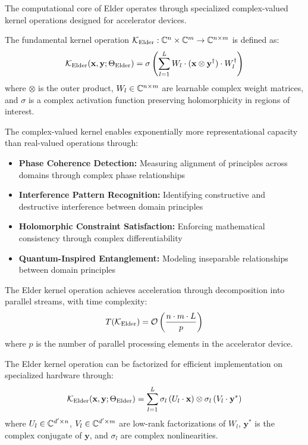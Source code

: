 The computational core of Elder operates through specialized complex-valued kernel operations designed for accelerator devices.

\begin{definition}
The fundamental kernel operation $\mathcal{K}_{\text{Elder}}: \mathbb{C}^n \times \mathbb{C}^m \rightarrow \mathbb{C}^{n \times m}$ is defined as:
\begin{equation}
\mathcal{K}_{\text{Elder}}(\mathbf{x}, \mathbf{y}; \Theta_{\text{Elder}}) = \sigma\left(\sum_{l=1}^L W_l \cdot (\mathbf{x} \otimes \mathbf{y}^{\dagger}) \cdot W_l^{\dagger}\right)
\end{equation}
where $\otimes$ is the outer product, $W_l \in \mathbb{C}^{n \times m}$ are learnable complex weight matrices, and $\sigma$ is a complex activation function preserving holomorphicity in regions of interest.
\end{definition}

The complex-valued kernel enables exponentially more representational capacity than real-valued operations through:

\begin{itemize}
    \item \textbf{Phase Coherence Detection:} Measuring alignment of principles across domains through complex phase relationships
    \item \textbf{Interference Pattern Recognition:} Identifying constructive and destructive interference between domain principles
    \item \textbf{Holomorphic Constraint Satisfaction:} Enforcing mathematical consistency through complex differentiability
    \item \textbf{Quantum-Inspired Entanglement:} Modeling inseparable relationships between domain principles
\end{itemize}

\begin{theorem}
The Elder kernel operation achieves acceleration through decomposition into parallel streams, with time complexity:
\begin{equation}
T(\mathcal{K}_{\text{Elder}}) = \mathcal{O}\left(\frac{n \cdot m \cdot L}{p}\right)
\end{equation}
where $p$ is the number of parallel processing elements in the accelerator device.
\end{theorem}

\begin{proposition}
The Elder kernel operation can be factorized for efficient implementation on specialized hardware through:
\begin{equation}
\mathcal{K}_{\text{Elder}}(\mathbf{x}, \mathbf{y}; \Theta_{\text{Elder}}) = \sum_{l=1}^L \sigma_l\left(U_l \cdot \mathbf{x}\right) \otimes \sigma_l\left(V_l \cdot \mathbf{y}^*\right)
\end{equation}
where $U_l \in \mathbb{C}^{d' \times n}$, $V_l \in \mathbb{C}^{d' \times m}$ are low-rank factorizations of $W_l$, $\mathbf{y}^*$ is the complex conjugate of $\mathbf{y}$, and $\sigma_l$ are complex nonlinearities.
\end{proposition}

